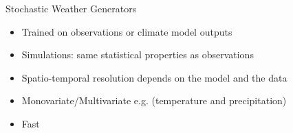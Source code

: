 \begin{frame}{Stochastic Weather Generators}
    \begin{itemize}
        \item Trained on observations or climate model outputs
        \item Simulations: same statistical properties as observations
        \item Spatio-temporal resolution depends on the model and the data
        \item Monovariate/Multivariate e.g. (temperature and precipitation)
        \item Fast
    \end{itemize}
\end{frame}